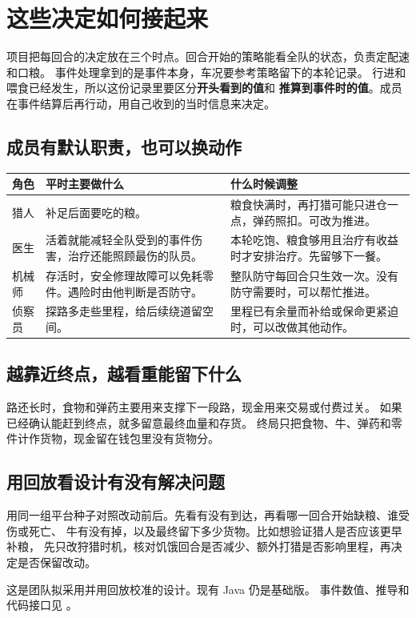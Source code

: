\documentclass[UTF8,11pt,a4paper]{ctexart}
\begin{document}
\clearpage
\section{这些决定如何接起来}

项目把每回合的决定放在三个时点。回合开始的策略能看全队的状态，负责定配速和口粮。
事件处理拿到的是事件本身，车况要参考策略留下的本轮记录。
行进和喂食已经发生，所以这份记录里要区分\textbf{开头看到的值}和
\textbf{推算到事件时的值}。成员在事件结算后再行动，用自己收到的当时信息来决定。

\subsection{成员有默认职责，也可以换动作}

\begin{center}\small
\begin{tabularx}{\linewidth}{@{}L{1.8cm}Y Y@{}}
\toprule
角色 & 平时主要做什么 & 什么时候调整 \\
\midrule
猎人 & 补足后面要吃的粮。 & 粮食快满时，再打猎可能只进仓一点，弹药照扣。可改为推进。 \\
医生 & 活着就能减轻全队受到的事件伤害，治疗还能照顾最伤的队员。 &
本轮吃饱、粮食够用且治疗有收益时才安排治疗。先留够下一餐。 \\
机械师 & 存活时，安全修理故障可以免耗零件。遇险时由他判断是否防守。 &
整队防守每回合只生效一次。没有防守需要时，可以帮忙推进。 \\
侦察员 & 探路多走些里程，给后续绕道留空间。 &
里程已有余量而补给或保命更紧迫时，可以改做其他动作。 \\
\bottomrule
\end{tabularx}
\end{center}

\subsection{越靠近终点，越看重能留下什么}

路还长时，食物和弹药主要用来支撑下一段路，现金用来交易或付费过关。
如果已经确认能赶到终点，就多留意最终血量和存货。
终局只把食物、牛、弹药和零件计作货物，现金留在钱包里没有货物分。

\subsection{用回放看设计有没有解决问题}

用同一组平台种子对照改动前后。先看有没有到达，再看哪一回合开始缺粮、谁受伤或死亡、
牛有没有掉，以及最终留下多少货物。比如想验证猎人是否应该更早补粮，
先只改狩猎时机，核对饥饿回合是否减少、额外打猎是否影响里程，再决定是否保留改动。

\medskip
\noindent\small 这是团队拟采用并用回放校准的设计。现有 Java 仍是基础版。
事件数值、推导和代码接口见
。
\end{document}
